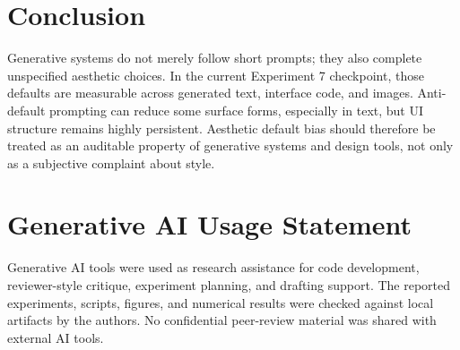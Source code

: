 \documentclass[10pt]{article}
\begin{document}
\section{Conclusion}

Generative systems do not merely follow short prompts; they also complete unspecified aesthetic choices. In the current Experiment 7 checkpoint, those defaults are measurable across generated text, interface code, and images. Anti-default prompting can reduce some surface forms, especially in text, but UI structure remains highly persistent. Aesthetic default bias should therefore be treated as an auditable property of generative systems and design tools, not only as a subjective complaint about style.

\section*{Generative AI Usage Statement}

Generative AI tools were used as research assistance for code development, reviewer-style critique, experiment planning, and drafting support. The reported experiments, scripts, figures, and numerical results were checked against local artifacts by the authors. No confidential peer-review material was shared with external AI tools.
\end{document}
